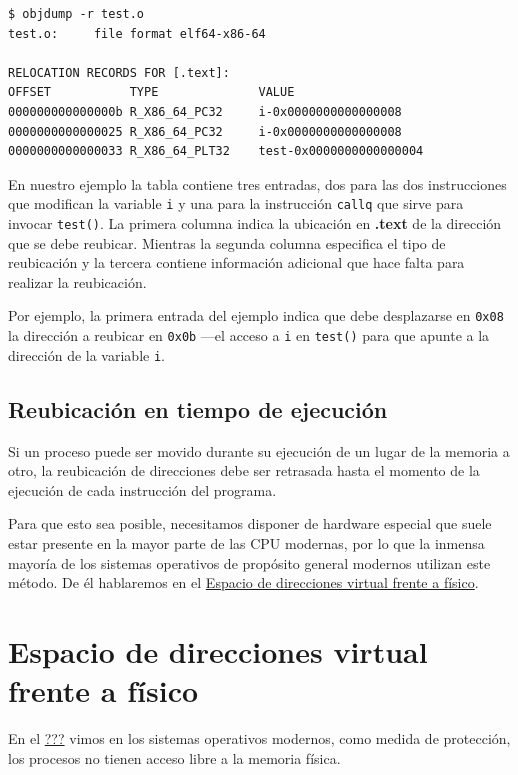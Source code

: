 \begin{verbatim}
$ objdump -r test.o
test.o:     file format elf64-x86-64

RELOCATION RECORDS FOR [.text]:
OFFSET           TYPE              VALUE
000000000000000b R_X86_64_PC32     i-0x0000000000000008
0000000000000025 R_X86_64_PC32     i-0x0000000000000008
0000000000000033 R_X86_64_PLT32    test-0x0000000000000004
\end{verbatim}

En nuestro ejemplo la tabla contiene tres entradas, dos para las dos
instrucciones que modifican la variable \texttt{i} y una para la
instrucción \texttt{callq} que sirve para invocar \texttt{test()}. La
primera columna indica la ubicación en \textbf{.text} de la dirección
que se debe reubicar. Mientras la segunda columna especifica el tipo de
reubicación y la tercera contiene información adicional que hace falta
para realizar la reubicación.

Por ejemplo, la primera entrada del ejemplo indica que debe desplazarse
en \texttt{0x08} la dirección a reubicar en \texttt{0x0b} ---el acceso a
\texttt{i} en \texttt{test()} para que apunte a la dirección de la
variable \texttt{i}.

\subsection{Reubicación en tiempo de
ejecución}\label{_reubicaciuxf3n_en_tiempo_de_ejecuciuxf3n}

Si un proceso puede ser movido durante su ejecución de un lugar de la
memoria a otro, la reubicación de direcciones debe ser retrasada hasta
el momento de la ejecución de cada instrucción del programa.

Para que esto sea posible, necesitamos disponer de hardware especial que
suele estar presente en la mayor parte de las CPU modernas, por lo que
la inmensa mayoría de los sistemas operativos de propósito general
modernos utilizan este método. De él hablaremos en el
\hyperref[_espacio_de_direcciones_virtual_frente_a_fuxedsico]{Espacio de
direcciones virtual frente a físico}.

\section{Espacio de direcciones virtual frente a
físico}\label{_espacio_de_direcciones_virtual_frente_a_fuxedsico}

En el \hyperref[_protecciuxf3n_de_la_memoria]{???} vimos en los sistemas
operativos modernos, como medida de protección, los procesos no tienen
acceso libre a la memoria física.

